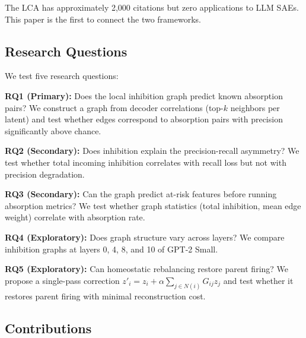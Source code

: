 \documentclass{article}
\begin{document}
The LCA has approximately 2,000 citations but zero applications to LLM SAEs. This paper is the first to connect the two frameworks.

\subsection{Research Questions}

We test five research questions:

\textbf{RQ1 (Primary):} Does the local inhibition graph predict known absorption pairs? We construct a graph from decoder correlations (top-$k$ neighbors per latent) and test whether edges correspond to \citet{chanin2024quantifying} absorption pairs with precision significantly above chance.

\textbf{RQ2 (Secondary):} Does inhibition explain the precision-recall asymmetry? We test whether total incoming inhibition correlates with recall loss but not with precision degradation.

\textbf{RQ3 (Secondary):} Can the graph predict at-risk features before running absorption metrics? We test whether graph statistics (total inhibition, mean edge weight) correlate with absorption rate.

\textbf{RQ4 (Exploratory):} Does graph structure vary across layers? We compare inhibition graphs at layers 0, 4, 8, and 10 of GPT-2 Small.

\textbf{RQ5 (Exploratory):} Can homeostatic rebalancing restore parent firing? We propose a single-pass correction $z'_i = z_i + \alpha \sum_{j \in N(i)} G_{ij} z_j$ and test whether it restores parent firing with minimal reconstruction cost.

\subsection{Contributions}
\end{document}
